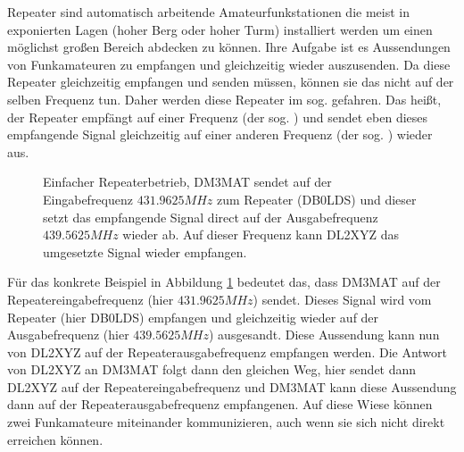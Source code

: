 Repeater sind automatisch arbeitende Amateurfunkstationen die meist in exponierten Lagen (hoher Berg oder hoher Turm) installiert werden um einen möglichst großen Bereich abdecken zu können. Ihre Aufgabe ist es Aussendungen von Funkamateuren zu empfangen und gleichzeitig wieder auszusenden. Da diese Repeater gleichzeitig empfangen und senden müssen, können sie das nicht auf der selben Frequenz tun. Daher werden diese Repeater im sog.  gefahren. Das heißt, der Repeater empfängt auf einer Frequenz (der sog. ) und sendet eben dieses empfangende Signal gleichzeitig auf einer anderen Frequenz (der sog. ) wieder aus. 

\begin{figure}[!ht]
 \centering
 \caption{Einfacher Repeaterbetrieb, DM3MAT sendet auf der Eingabefrequenz $431.9625 MHz$ zum Repeater (DB0LDS) und dieser setzt das empfangende Signal direct auf der Ausgabefrequenz $439.5625 MHz$ wieder ab. Auf dieser Frequenz kann DL2XYZ das umgesetzte Signal wieder empfangen.} \label{fig:basicrepeater}
\end{figure}

Für das konkrete Beispiel in Abbildung \ref{fig:basicrepeater} bedeutet das, dass DM3MAT auf der Repeatereingabefrequenz (hier $431.9625 MHz$) sendet. Dieses Signal wird vom Repeater (hier DB0LDS) empfangen und gleichzeitig wieder auf der Ausgabefrequenz (hier $439.5625 MHz$) ausgesandt. Diese Aussendung kann nun von DL2XYZ auf der Repeaterausgabefrequenz empfangen werden. Die Antwort von DL2XYZ an DM3MAT folgt dann den gleichen Weg, hier sendet dann DL2XYZ auf der Repeatereingabefrequenz und DM3MAT kann diese Aussendung dann auf der Repeaterausgabefrequenz empfangenen. Auf diese Wiese können zwei Funkamateure miteinander kommunizieren, auch wenn sie sich nicht direkt erreichen können. 

